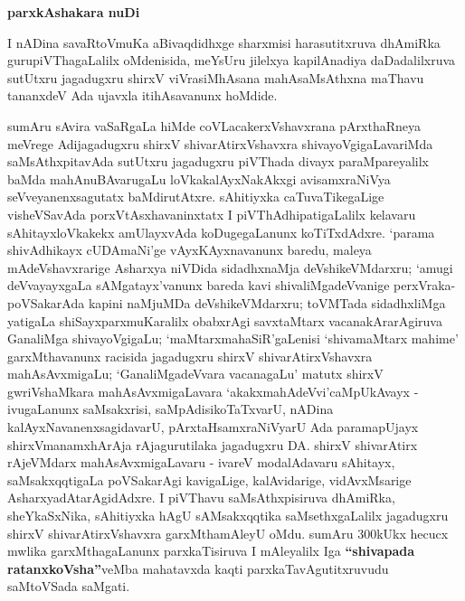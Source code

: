 \begin{center}
{\Huge\bfseries parxkAshakara nuDi}
\end{center}

I nADina savaRtoVmuKa aBivaqdidhxge sharxmisi harasutitxruva dhAmiRka gurupiVThagaLalilx oMdenisida, meYsUru jilelxya kapilA\-nadiya daDadalilxruva sutUtxru jagadugxru shirxV viVrasiMhAsana mahAsaMsAthxna maThavu tananxdeV Ada ujavxla itihAsavanunx hoMdide.

\medskip

sumAru sAvira vaSaRgaLa hiMde coVLacakerxVshavxrana pArxthaRneya meVrege Adijagadugxru shirxV shivarAtirxVshavxra shivayoVgigaLavariMda saMsAthxpitavAda sutUtxru jagadugxru piVThada divayx paraMpareyalilx baMda mahAnuBAvarugaLu loVkakalAyxNakAkxgi avisamxraNiVya seVveyanenxsagutatx baMdirutAtxre. sAhitiyxka caTuvaTikegaLige visheVSavAda porxVtAsxhavaninxtatx I piVThAdhipatigaLalilx kelavaru sAhitayxloVkakekx amUlayxvAda koDugegaLanunx koTiTxdAdxre. `parama shivAdhikayx cUDAmaNi'ge vAyxKAyxnavanunx baredu, maleya mAdeVshavxrarige Asharxya niVDida sidadhxnaMja deVshikeVMdarxru; `amugi deVvayayxgaLa sAMgatayx'vanunx bareda kavi shivaliMga\-deVvanige perxVraka-poVSakarAda kapini naMjuMDa deVshikeVMdarxru; toVMTada sidadhxliMga yatigaLa shiSayxparxmuKaralilx obabxrAgi savxtaMtarx vacana\-kAra\-rAgiruva GanaliMga shivayoVgigaLu; `maMtarxmahaSiR'gaLenisi `shivamaMtarx mahime' garxMthavanunx racisida jagadugxru shirxV shivarAtirxVshavxra mahAsAvxmigaLu; `GanaliMgadeVvara vacanagaLu' matutx shirxV gwriVshaMkara mahAsAvxmigaLavara `akakxmahAdeVvi'\break caMpUkAvayx - ivugaLanunx saMsakxrisi, saMpAdisikoTaTxvarU, nADina kalAyxNavanenxsagidavarU, pArxtaHsamxraNiVyarU Ada paramapUjayx shirxVmanamxhArAja rAjagurutilaka jagadugxru DA. shirxV shivarAtirx rAjeVMdarx mahAsAvxmigaLavaru - ivareV modalAdavaru sAhitayx, saMsakxqqti\-gaLa poVSakarAgi kavigaLige, kalAvidarige, vidAvxMsarige AsharxyadAtarAgidAdxre. I piVThavu saMsAthxpisiruva dhAmiRka, sheYkaSxNika, sAhitiyxka hAgU sAMsakxqqtika saMsethxgaLalilx jagadugxru shirxV shivarAtirxVshavxra garxMtha\-mAleyU oMdu. sumAru 300kUkx hecucx mwlika garxMthagaLanunx parxkaTisiruva I mAleyalilx Iga \textbf{``shivapada ratanxkoVsha''}veMba mahatavxda kaqti parxkaTavAgutitxruvudu saMtoVSada saMgati.

\medskip

